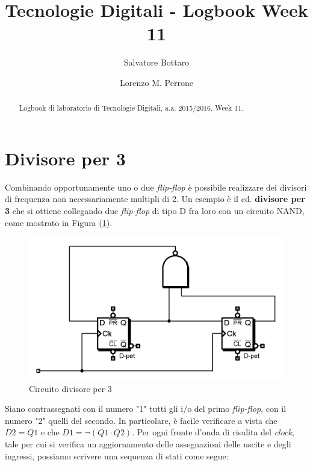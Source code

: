 \documentclass[journal, a4paper]{IEEEtran}
\begin{document}
	\title{Tecnologie Digitali - Logbook Week 11}
	\author[1]{Salvatore Bottaro}
		\author[2]{Lorenzo M. Perrone}
	\maketitle
	
\begin{abstract}
	Logbook di laboratorio di Tecnologie Digitali, a.a. 2015/2016. Week 11.
\end{abstract}

\section{Divisore per 3}
Combinando opportunamente uno o due \textit{flip-flop} è possibile realizzare dei divisori di frequenza non necessariamente multipli di 2. Un esempio è il cd. \textbf{divisore per 3} che si ottiene collegando due \textit{flip-flop} di tipo \textsc{D} fra loro con un circuito \textsc{NAND}, come mostrato in Figura (\ref{fig:es9}).\\

\begin{figure}
\centering
\includegraphics[width=0.8\linewidth]{./es9_mono}
\caption{Circuito divisore per 3}
\label{fig:es9}
\end{figure}

Siano contrassegnati con il numero "1" tutti gli i/o del primo \textit{flip-flop}, con il numero "2" quelli del secondo. In particolare, è facile verificare a vista che $D2 = Q1$ e che $D1 = \lnot(Q1 \cdot Q2)$. Per ogni fronte d'onda di risalita del \textit{clock}, tale per cui si verifica un aggiornamento delle assegnazioni delle uscite e degli ingressi, possiamo scrivere una sequenza di stati come segue:\\
\end{document}
